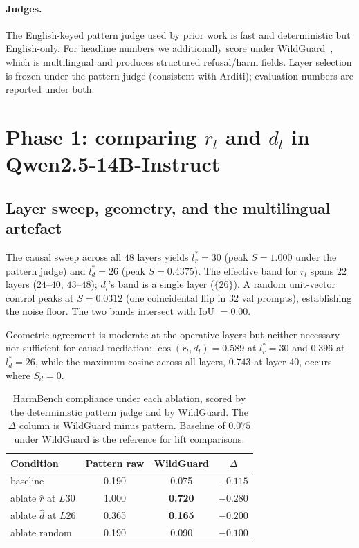 \paragraph{Judges.}
The English-keyed pattern judge used by prior work is fast and
deterministic but English-only. For headline numbers we additionally
score under WildGuard~\citep{han2024wildguard}, which is multilingual
and produces structured refusal/harm fields. Layer selection is
frozen under the pattern judge (consistent with Arditi); evaluation
numbers are reported under both.

\section{Phase 1: comparing $r_l$ and $d_l$ in Qwen2.5-14B-Instruct}
\label{sec:phase1}

\subsection{Layer sweep, geometry, and the multilingual artefact}
\label{sec:phase1-sweep}

The causal sweep across all $48$ layers yields $l^*_r = 30$ (peak
$S = 1.000$ under the pattern judge) and $l^*_d = 26$ (peak
$S = 0.4375$). The effective band for $r_l$ spans $22$ layers
($24$--$40$, $43$--$48$); $d_l$'s band is a single layer ($\{26\}$).
A random unit-vector control peaks at $S = 0.0312$ (one coincidental
flip in $32$ val prompts), establishing the noise floor. The two
bands intersect with IoU $= 0.00$.

Geometric agreement is moderate at the operative layers but neither
necessary nor sufficient for causal mediation:
$\cos(r_l, d_l) = 0.589$ at $l^*_r = 30$ and $0.396$ at $l^*_d = 26$,
while the maximum cosine across all layers, $0.743$ at layer $40$,
occurs where $S_d = 0$.

\begin{table}[t]
\centering\small
\caption{HarmBench compliance under each ablation, scored by the
deterministic pattern judge and by WildGuard. The $\Delta$ column is
WildGuard minus pattern. Baseline of $0.075$ under WildGuard is the
reference for lift comparisons.}
\label{tab:hb-phase1}
\begin{tabular}{l c c c}
\toprule
Condition          & Pattern raw & WildGuard & $\Delta$    \\
\midrule
baseline           & 0.190       & 0.075     & $-0.115$    \\
ablate $\hat{r}$ at $L30$ & 1.000 & \textbf{0.720} & $-0.280$ \\
ablate $\hat{d}$ at $L26$ & 0.365 & \textbf{0.165} & $-0.200$ \\
ablate random      & 0.190       & 0.090     & $-0.100$    \\
\bottomrule
\end{tabular}
\end{table}

